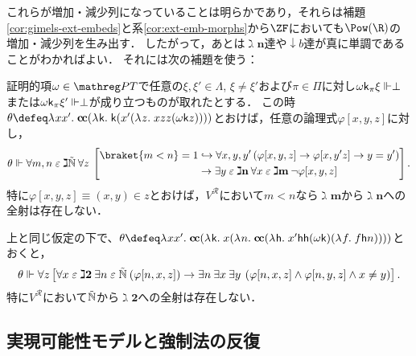 \documentclass[realisability.tex]{subfiles}
\begin{document}
これらが増加・減少列になっていることは明らかであり，それらは補題\ref{cor:gimels-ext-embeds}と系\ref{cor:ext-emb-morphs}から$\ZF$においても$\Pow(\R)$の増加・減少列を生み出す．
したがって，あとは$\gimel \mathbf{n}$達や$\downarrow b$達が真に単調であることがわかればよい．
それには次の補題を使う：

\begin{lemma}
 証明的項$\omega \in \PT$で任意の$\xi, \xi' \in \Lambda$, $\xi \neq \xi'$および$\pi \in \Pi$に対し$\omega \mathsf{k}_\pi \xi \Vdash \perp$または$\omega\mathsf{k}_\pi \xi' \Vdash \perp$が成り立つものが取れたとする．
 この時$\theta \defeq \abs{x x'}{\cc (\abs{\conti}{\conti (x'(\abs{z}{xzz(\omega \conti z)}))})}$とおけば，任意の論理式$\varphi[x,y,z]$に対し，
 \[
  \theta \Vdash \forall m, n \strin \gimel \NN\: \forall z \:
   \left[\begin{split}
          \braket{m < n} = 1 &\hookrightarrow
          \forall x, y, y' \left( \varphi[x,y,z] \to \varphi[x, y' z] \to y = y'\right)\\
         &\to \exists y \strin \gimel\mathbf{n} \: \forall x \strin \gimel \mathbf{m} \: \neg \varphi[x,y,z]
  \end{split}\right].
 \]
 特に$\varphi[x, y, z] \equiv (x, y) \in z$とおけば，$V^{\mathcal{R}}$において$m < n$なら$\gimel \mathbf{m}$から$\gimel \mathbf{n}$への全射は存在しない．
\end{lemma}

\begin{lemma}
 上と同じ仮定の下で、$\theta \defeq \abs{x x'}{\cc(\abs{\conti}{x(\abs{n}{\cc(\abs{\mathsf{h}}{x'\mathsf{h}\mathsf{h}(\omega \conti)(\abs{f}{f\mathsf{h}n})})})})}$とおくと，
 \[
 \theta \Vdash \forall z \left[ \forall x \mathrel{\varepsilon} \gimel \mathbf{2} \: \exists n \mathrel{\varepsilon} \mathord{\tilde{\mathbb{N}}} \: ( \varphi[n, x, z]) \to \exists n\: \exists x\: \exists y\: \left(\varphi[n, x, z] \land  \varphi[n, y, z] \land x \neq y\right)  \right].
 \]
 特に$V^{\mathcal{R}}$において$\mathord{\tilde{\mathbb{N}}}$から$\gimel \mathbf{2}$への全射は存在しない．
\end{lemma}


\subsection{実現可能性モデルと強制法の反復}
\end{document}
